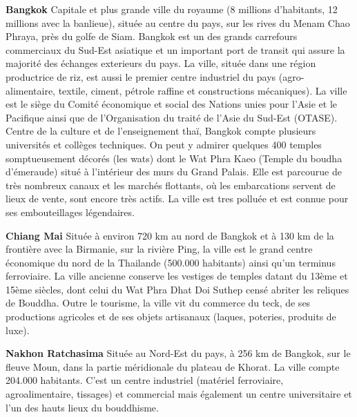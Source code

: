 \begin{multicols}{2}
\textbf{Bangkok}
Capitale et plus grande ville du royaume (8 millions d’habitants, 12 millions avec la banlieue), située au centre du pays, sur les rives du Menam Chao Phraya, près du golfe de Siam. Bangkok est un des grands carrefours commerciaux du Sud-Est asiatique et un important port de transit qui assure la majorité des échanges exterieurs du pays. La ville, située dans une région productrice de riz, est aussi le premier centre industriel du pays (agro-alimentaire, textile, ciment, pétrole raffine et constructions mécaniques). La ville est le siège du Comité économique et social des Nations unies pour l’Asie et le Pacifique ainsi que de l’Organisation du traité de l’Asie du Sud-Est (OTASE). Centre de la culture et de l’enseignement thaï, Bangkok compte plusieurs universités et collèges techniques. On peut y admirer quelques 400 temples somptueusement décorés (les wats) dont le Wat Phra Kaeo (Temple du boudha d’émeraude) situé à l’intérieur des murs du Grand Palais. Elle est parcourue de très nombreux canaux et les marchés flottants, où les embarcations servent de lieux de vente, sont encore très actifs. La ville est tres polluée et est connue pour ses embouteillages légendaires.

\textbf{Chiang Mai}
Située à environ 720 km au nord de Bangkok et à 130 km de la frontière avec la Birmanie, sur la rivière Ping, la ville est le grand centre économique du nord de la Thailande (500.000 habitants) ainsi qu’un terminus ferroviaire. La ville ancienne conserve les vestiges de temples datant du 13ème et 15ème siècles, dont celui du Wat Phra Dhat Doi Suthep censé abriter les reliques de Bouddha. Outre le tourisme, la ville vit du commerce du teck, de ses productions agricoles et de ses objets artisanaux (laques, poteries, produits de luxe).

\textbf{Nakhon Ratchasima}
Située au Nord-Est du pays, à 256 km de Bangkok, sur le fleuve Moun, dans la partie méridionale du plateau de Khorat. La ville compte 204.000 habitants. C’est un centre industriel (matériel ferroviaire, agroalimentaire, tissages) et commercial mais également un centre universitaire et l’un des hauts lieux du bouddhisme.

\end{multicols}
